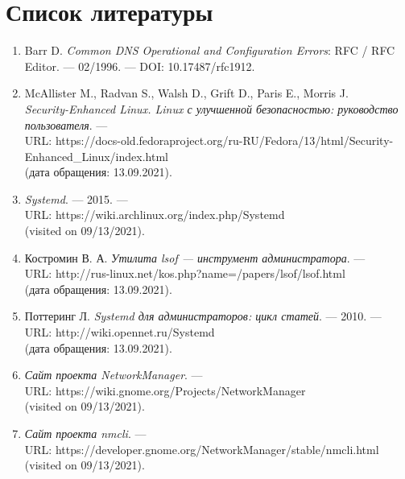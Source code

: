 \documentclass[
  12pt,
  a4paper,
  DIV=11,
  numbers=noendperiod]{scrreprt}
\begin{document}
\chapter{Список
литературы}\label{ux441ux43fux438ux441ux43eux43a-ux43bux438ux442ux435ux440ux430ux442ux443ux440ux44b}

\begin{enumerate}
\def\labelenumi{\arabic{enumi}.}
\item
  Barr D. \emph{Common DNS Operational and Configuration Errors}: RFC /
  RFC Editor. --- 02/1996. --- DOI: 10.17487/rfc1912.
\item
  McAllister M., Radvan S., Walsh D., Grift D., Paris E., Morris J.\\
  \emph{Security-Enhanced Linux. Linux с улучшенной безопасностью:
  руководство пользователя}. ---\\
  URL:
  https://docs-old.fedoraproject.org/ru-RU/Fedora/13/html/Security-Enhanced\_Linux/index.html\\
  (дата обращения: 13.09.2021).
\item
  \emph{Systemd}. --- 2015. ---\\
  URL: https://wiki.archlinux.org/index.php/Systemd\\
  (visited on 09/13/2021).
\item
  Костромин В. А. \emph{Утилита lsof --- инструмент администратора}.
  ---\\
  URL: http://rus-linux.net/kos.php?name=/papers/lsof/lsof.html\\
  (дата обращения: 13.09.2021).
\item
  Поттеринг Л. \emph{Systemd для администраторов: цикл статей}. ---
  2010. ---\\
  URL: http://wiki.opennet.ru/Systemd\\
  (дата обращения: 13.09.2021).
\item
  \emph{Сайт проекта NetworkManager}. ---\\
  URL: https://wiki.gnome.org/Projects/NetworkManager\\
  (visited on 09/13/2021).
\item
  \emph{Сайт проекта nmcli}. ---\\
  URL: https://developer.gnome.org/NetworkManager/stable/nmcli.html\\
  (visited on 09/13/2021).
\end{enumerate}


\printbibliography
\end{document}
